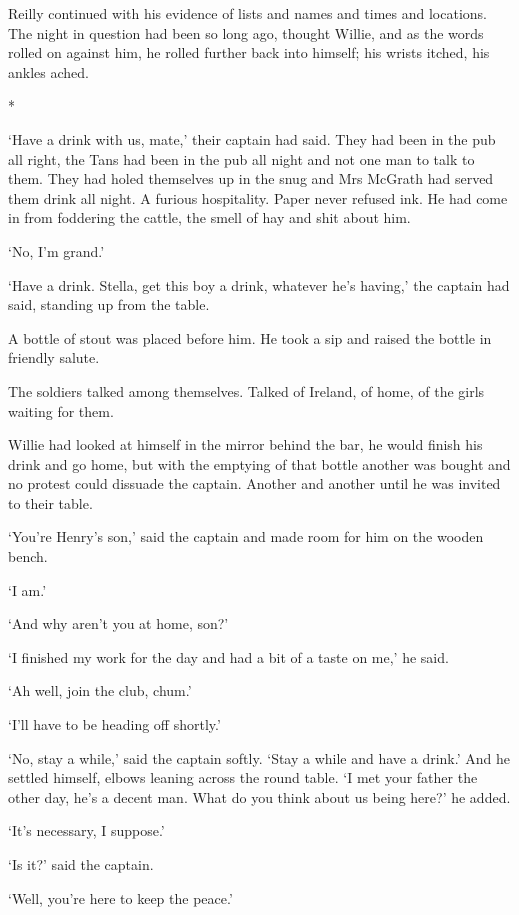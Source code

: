 \documentclass[10pt,a4paper]{article}
\begin{document}
Reilly continued with his evidence of lists and names and times and locations. The night in question had been so long ago, thought Willie, and as the words rolled on against him, he rolled further back into himself; his wrists itched, his ankles ached.

\begin{center}*\end{center}

‘Have a drink with us, mate,’ their captain had said. They had been in the pub all right, the Tans had been in the pub all night and not one man to talk to them. They had holed themselves up in the snug and Mrs McGrath had served them drink all night. A furious hospitality. Paper never refused ink. He had come in from foddering the cattle, the smell of hay and shit about him.

‘No, I’m grand.’

‘Have a drink. Stella, get this boy a drink, whatever he’s having,’ the captain had said, standing up from the table.

A bottle of stout was placed before him. He took a sip and raised the bottle in friendly salute.

The soldiers talked among themselves. Talked of Ireland, of home, of the girls waiting for them.

Willie had looked at himself in the mirror behind the bar, he would finish his drink and go home, but with the emptying of that bottle another was bought and no protest could dissuade the captain. Another and another until he was invited to their table.

‘You’re Henry’s son,’ said the captain and made room for him on the wooden bench.

‘I am.’

‘And why aren’t you at home, son?’

‘I finished my work for the day and had a bit of a taste on me,’ he said.

‘Ah well, join the club, chum.’

‘I’ll have to be heading off shortly.’

‘No, stay a while,’ said the captain softly. ‘Stay a while and have a drink.’ And he settled himself, elbows leaning across the round table. ‘I met your father the other day, he’s a decent man. What do you think about us being here?’ he added.

‘It’s necessary, I suppose.’

‘Is it?’ said the captain.

‘Well, you’re here to keep the peace.’
\end{document}
